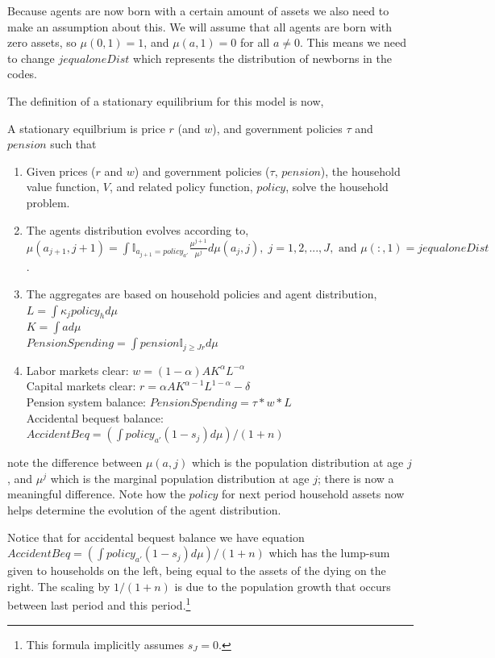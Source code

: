 Because agents are now born with a certain amount of assets we also need to make an assumption about this. We will assume that all agents are born with zero assets, so $\mu(0,1)=1$, and $\mu(a,1)=0$ for all $a \neq 0$. This means we need to change $jequaloneDist$ which represents the distribution of newborns in the codes.

The definition of a stationary equilibrium for this model is now,
\begin{definition}
 A stationary equilbrium is price $r$ (and $w$), and government policies $\tau$ and $pension$ such that
 \begin{enumerate}
  \item Given prices ($r$ and $w$) and government policies ($\tau$, $pension$), the household value function, $V$, and related policy function, $policy$, solve the household problem.
  \item The agents distribution evolves according to,
   \\  $\mu(a_{j+1},j+1)=\int \mathbb{I}_{a_{j+1}=policy_{a'}} \frac{\mu^{j+1}}{\mu^j} d\mu(a_j,j), \; j=1,2,...,J,\text{ and } \mu(:,1)=jequaloneDist$.
  \item The aggregates are based on household policies and agent distribution,
   \\ $L=\int \kappa_j policy_h d\mu$
   \\ $K=\int a d\mu$
   \\ $PensionSpending=\int pension \mathbb{I}_{j\geq Jr} d\mu$
  \item Labor markets clear: $w=(1-\alpha)A K^{\alpha}L^{-\alpha}$
   \\ Capital markets clear: $r=\alpha A K^{\alpha-1} L^{1-\alpha} - \delta$
   \\ Pension system balance: $PensionSpending=\tau*w*L$
   \\ Accidental bequest balance: $AccidentBeq=(\int policy_{a'}(1-s_j) d\mu)/(1+n)$
 \end{enumerate}
\end{definition}
\noindent note the difference between $\mu(a,j)$ which is the population distribution at age $j$, and $\mu^j$ which is the marginal population distribution at age $j$; there is now a meaningful difference. Note how the $policy$ for next period household assets now helps determine the evolution of the agent distribution.

Notice that for accidental bequest balance we have equation $AccidentBeq=(\int policy_{a'} (1-s_j) d\mu)/(1+n)$ which has the lump-sum given to households on the left, being equal to the assets of the dying on the right. The scaling by $1/(1+n)$ is due to the population growth that occurs between last period and this period.\footnote{This formula implicitly assumes $s_J=0$.}


